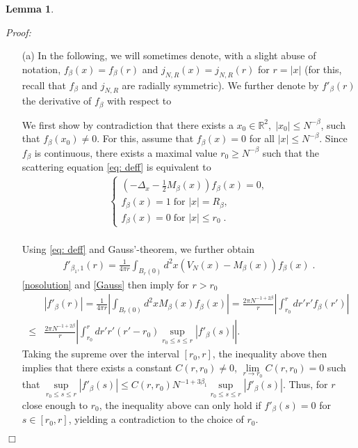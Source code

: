 \documentclass[11pt, english, american]{article}
\newtheorem{lemma}[theorem]{Lemma}
\newenvironment{proof}{\emph{Proof:}}{\begin{flushright} $ \Box $ \end{flushright}}
\begin{document}
\begin{lemma}
\end{lemma}

\begin{proof}
\begin{enumerate}
\item[(a)]
In the following, we will sometimes denote, 
with a slight abuse of notation, $f_{\beta}(x)=f_{\beta}(r)$
and $j_{N,R}(x)=j_{N,R}(r)$
 for $r=|x|$ (for this, recall that $f_{\beta}$ and $j_{N,R}$ are radially symmetric). 
 We further denote by $f'_{\beta}(r)$ the derivative of $f_{\beta}$ with respect to

We first show by contradiction that there exists a $x_0 \in \mathbb{R}^2,\; |x_0|\leq N^{-\beta}$, such that $f_\beta(x_0) \neq 0$.
For this, assume  that 
$f_{\beta} (x) =0$ for all $|x| \leq N^{-\beta}$. 
Since $f_{\beta}$ is continuous, there exists a maximal value $r_0 \geq N^{-\beta}$ such that the scattering
equation \eqref{eq: deff} is equivalent to
\begin{align}
\label{nosolution}
 \begin{cases} 
\left( - \Delta_x - \frac{1}{2} M_{\beta}(x) \right) f_{\beta}(x)=0,
\\
f_{\beta}(x)=1 \; \text{for } |x| = R_{\beta},
\\
f_{\beta}(x)=0 \; \text{for } |x| \leq r_0
\;.
  \end{cases}
\end{align}
\\

Using \eqref{eq: deff} and Gauss'-theorem, we further obtain
\begin{align}
\label{Gauss}
f'_{\beta_1, 1}(r) =
\frac{1}{ 4 \pi r }
\int_{B_r(0)} d^2 x (V_N(x)-M_\beta(x)) f_\beta(x) 
\;.
\end{align}
 \eqref{nosolution} and \eqref{Gauss} then imply for $r > r_0$
 \begin{align*}
&
 \left| f'_{\beta}(r)
\right| 
  =
\frac{1}{ 4 \pi r }
\left|
\int_{B_r(0)} d^2 x M_{\beta}(x) f_{\beta}(x) 
\right|
=
\frac{2 \pi  
N^{-1+2 \beta}
}{  r }
\left|
\int_{r_0}^r dr' r'f_{\beta}(r') 
\right|
\\
\leq&
\frac{2 \pi 
N^{-1+2 \beta}
}{ r}
\left|
\int_{r_0}^r dr' r'
(r'-r_0)  
\sup_{r_0 \leq s \leq r}
|f'_{\beta}(s)|
\right| .
 \end{align*}
Taking the supreme over the interval 
$[r_0,r]$, the inequality above then implies that
there exists a constant $C(r,r_0) \neq 0$, $ \lim\limits_{r \rightarrow r_0} C(r,r_0)=0$ such that
 $
 \sup\limits_{r_0 \leq s \leq r}
|f'_{\beta}(s)|
 \leq
C(r,r_0)
N^{-1+3 \beta_1}
\sup\limits_{r_0 \leq s \leq r}
|f'_{\beta}(s)|
 $. Thus, for $r$ close enough to $r_0$, the inequality above can only hold if 
 $
f'_{\beta}(s)=0 
 $ for $s \in [r_0,r]$, yielding a contradiction to the choice of $r_0$.


\end{enumerate}
\end{proof}
\end{document}
